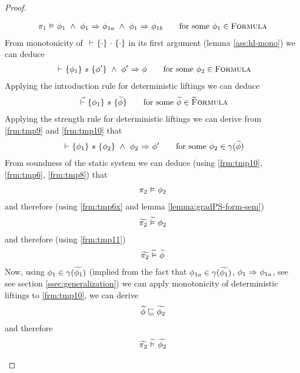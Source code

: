 \begin{proof}
\begin{description}
        \begin{align}
        \label{frm:tmp8}
        \pi_1 \,\,{\vDash}\,\, \phi_1 ~\wedge~ {\phi_1} \,\,{\Rightarrow}\,\, {\phi_{1a}} ~\wedge~ {\phi_1} \,\,{\Rightarrow}\,\, {\phi_{1b}}
        \quad\quad\text{for some } \phi_1 \in \textup{\textsc{Formula}}
        \end{align}
        From monotonicity of ${} \,\,{\vdash}\,\, \{{\cdot}\} ~{\cdot}~ \{{\cdot}\}$ in its first argument (lemma \ref{ass:hl-mono}) we can deduce
        \begin{align}
        \label{frm:tmp9}
        {} \,\,{\vdash}\,\, \{{\phi_1}\} ~{s}~ \{{\phi'}\} ~\wedge~ {\phi'} \,\,{\Rightarrow}\,\, {\phi}
        \quad\quad\text{for some } \phi_2 \in \textup{\textsc{Formula}}
        \end{align}
        Applying the introduction rule for deterministic liftings we can deduce
        \begin{align}
        \label{frm:tmp10}
        {} \,\,\vec{\vdash}\,\, \{{\phi_1}\} ~{s}~ \{{\widetilde{\phi}}\}
        \quad\quad\text{for some } \widetilde{\phi} \in \textup{\textsc{\ensuremath{\widetilde{\text{F}}}ormula}}
        \end{align}
        Applying the strength rule for deterministic liftings we can derive from \ref{frm:tmp9} and \ref{frm:tmp10} that
        \begin{align}
        \label{frm:tmp11}
        {} \,\,{\vdash}\,\, \{{\phi_1}\} ~{s}~ \{{\phi_2}\} ~\wedge~ {\phi_2} \,\,{\Rightarrow}\,\, {\phi'}
        \quad\quad\text{for some } \phi_2 \in \gamma(\widetilde{\phi})
        \end{align}
        From soundness of the static system we can deduce (using \ref{frm:tmp10}, \ref{frm:tmp6}, \ref{frm:tmp8}) that
        \begin{align}
        \label{frm:tmp12}
        \pi_2 \,\,{\vDash}\,\, \phi_2
        \end{align}
        and therefore (using \ref{frm:tmp6x} and lemma \ref{lemma:gradPS-form-sem})
        \begin{align}
        \label{frm:tmp14}
        \widetilde{\pi_2} \,\,\widetilde{\vDash}\,\, \phi_2
        \end{align}
        and therefore (using \ref{frm:tmp11})
        \begin{align}
        \label{frm:tmp13}
        \widetilde{\pi_2} \,\,\widetilde{\vDash}\,\, \widetilde{\phi}
        \end{align}
        Now, using $\phi_1 \in \gamma(\widetilde{\phi_1})$ (implied from the fact that $\phi_{1a} \in \gamma(\widetilde{\phi_1})$, ${\phi_1} \,\,{\Rightarrow}\,\, {\phi_{1a}}$, see see section \ref{ssec:generalization}) we can apply monotonicity of deterministic liftings to \ref{frm:tmp10}, we can derive
        \begin{align}
        \label{frm:tmp15}
        \widetilde{\phi} \sqsubseteq \widetilde{\phi_2}
        \end{align}
        and therefore
        \begin{align}
        \label{frm:tmp16}
        \widetilde{\pi_2} \,\,\widetilde{\vDash}\,\, \widetilde{\phi_2}
        \end{align}
    \end{description}
\end{proof}